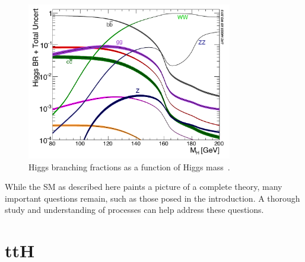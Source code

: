 \begin{figure}[hbtp]
 \begin{center}
   \includegraphics[width=0.8\textwidth]{ch2_figs/higgs_decay.pdf}
   \caption{Higgs branching fractions as a function of Higgs mass~\cite{lhchxswg}.}
   \label{fig:higgs_decay}
 \end{center}
\end{figure}

While the SM as described here paints a picture of a complete theory, many important questions remain, such as those posed in the introduction.
A thorough study and understanding of \tth processes can help address these questions.  

\section{ttH}
